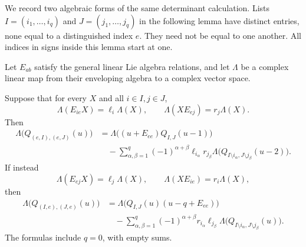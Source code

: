 We record two algebraic forms of the same determinant
calculation.  Lists $I=(i_1,\ldots,i_q)$ and
$J=(j_1,\ldots,j_q)$ in the following lemma have distinct
entries, none equal to a distinguished index $e$.
They need not be equal to one another.
All indices in signs inside this lemma start at one.

\begin{lemma}\label{rc-border}
Let $E_{ab}$ satisfy the general linear Lie algebra
relations, and let $\Lambda$ be a complex linear map
from their enveloping algebra to a complex vector space.

Suppose that for every $X$ and all $i\in I,j\in J$,
\[
 \Lambda(E_{ie}X)=\ell_i\Lambda(X),\qquad
 \Lambda(XE_{ej})=r_j\Lambda(X).
\]
Then
\begin{align}
 \Lambda\bigl(Q_{(e,I),(e,J)}(u)\bigr)
 &=\Lambda\bigl((u+E_{ee})Q_{I,J}(u-1)\bigr)\nonumber\\
 &\quad-\sum_{\alpha,\beta=1}^{q}
     (-1)^{\alpha+\beta}\ell_{i_\alpha}r_{j_\beta}
       \Lambda\bigl(Q_{I\setminus i_\alpha,J\setminus j_\beta}
                                                   (u-2)\bigr).
                                                     \label{rc-border-first}
\end{align}
If instead
\[
 \Lambda(E_{ej}X)=\ell_j\Lambda(X),\qquad
 \Lambda(XE_{ie})=r_i\Lambda(X),
\]
then
\begin{align}
 \Lambda\bigl(Q_{(I,e),(J,e)}(u)\bigr)
 &=\Lambda\bigl(Q_{I,J}(u)(u-q+E_{ee})\bigr)\nonumber\\
 &\quad-\sum_{\alpha,\beta=1}^{q}
     (-1)^{\alpha+\beta}r_{i_\alpha}\ell_{j_\beta}
       \Lambda\bigl(Q_{I\setminus i_\alpha,J\setminus j_\beta}
                                                     (u)\bigr).
                                                     \label{rc-border-last}
\end{align}
The formulas include $q=0$, with empty sums.
\end{lemma}

